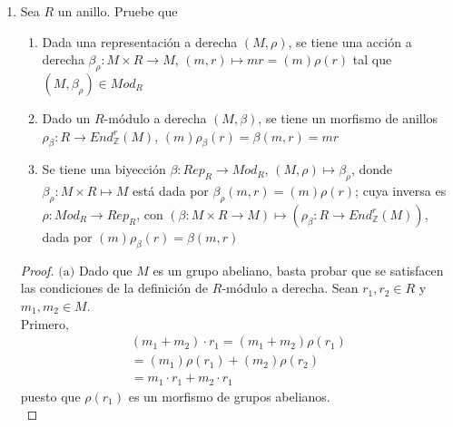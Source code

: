 \documentclass{article}
\newcommand{\lrprth}[1]{
    \left(#1\right)
}
\newcommand{\zend}[2]{
    End_{\mathbb{Z}}^{#2}\lrprth{#1}
}
\theoremstyle{definition}
\theoremstyle{plain}
\theoremstyle{plain}
\theoremstyle{definition}
\theoremstyle{definition}
\theoremstyle{definition}
\theoremstyle{definition}
\theoremstyle{definition}
\theoremstyle{definition}
\begin{document}
\begin{enumerate}[label=\textbf{Ej \arabic*.}]
\begin{proof}
\begin{align*}
         &=g\lrprth{\lrprth{{}_RM,\bullet_\lambda}}\\
         &=\lrprth{\lambda_{\bullet_\lambda},M}.
         \intertext{Sea $r\in R$ y $m\in M$. Se tiene que}
         \lambda_{\bullet_\lambda}(r)\lrprth{m}&=r\bullet_\lambda m\\
         &=\lambda(r)\lrprth{m}\\
         &\implies \lambda_{\bullet_\lambda}(r)=\lambda(r)\\
         &\implies \lambda_{\bullet_\lambda}=\lambda\\
         &\implies g\circ f\lrprth{\lrprth{\lambda,M}}=\lrprth{\lambda, M}\\
         \implies g\circ f &=Id_{{}_RRep}.
    \end{align*}
    De modo que $f$ es invertible, con inversa $g$, y por lo tanto es una biyección, con lo cual se tiene lo deseado.
    \end{proof}
    \item 
    Sea $R$ un anillo. Pruebe que
\begin{enumerate}
	\item Dada una representación a derecha $\lrprth{M, \rho}$, se tiene una acción a derecha $\beta_{\rho} : M \times R \longrightarrow M$, $\lrprth{m,r} \mapsto mr=\lrprth{m}\rho\lrprth{r}$ tal que $\lrprth{M, \beta_{\rho}}\in Mod_{R}$
	\item Dado un $R$-módulo a derecha $\lrprth{M, \beta}$, se tiene un morfismo de anillos $\rho_{\beta}:R \longrightarrow \zend{M}{r}$, $\lrprth{m}\rho_{\beta}\lrprth{r}=\beta\lrprth{m,r}=mr$
	\item Se tiene una biyección $\beta :Rep_{R} \longrightarrow Mod_{R}$, $\lrprth{M, \rho}\mapsto\beta_{\rho}$, donde $\beta_{\rho}:M \times R \mapsto M$ está dada por $\beta_{\rho}\lrprth{m,r}=\lrprth{m}\rho\lrprth{r}$; cuya inversa es $\rho :Mod_{R} \longrightarrow Rep_{R}$, con $\lrprth{\beta :M \times R \longrightarrow M}\mapsto\lrprth{\rho_{\beta}:R \longrightarrow\zend{M}{r}}$, dada por $\lrprth{m}\rho_{\beta}\lrprth{r}=\beta\lrprth{m,r}$
\end{enumerate}
\begin{proof}
$\boxed{\text{(a)}}$ Dado que $M$ es un grupo abeliano, basta probar que se satisfacen las condiciones de la definición de $R$-módulo a derecha. Sean $r_{1},r_{2} \in R$ y $m_{1},m_{2} \in M$.\\

Primero,
\begin{align*}
\lrprth{m_{1}+m_{2}} \cdot r_{1}=\lrprth{m_{1}+m_{2}}\rho\lrprth{r_{1}}\\
=\lrprth{m_{1}} \rho \lrprth{r_{1}} + \lrprth{m_{2}} \rho \lrprth{r_{2}}\\
=m_{1} \cdot r_{1} + m_{2} \cdot r_{1}
\end{align*}
puesto que $\rho \lrprth{r_{1}}$ es un morfismo de grupos abelianos.\\
	

\end{proof}
\end{enumerate}
\end{document}
